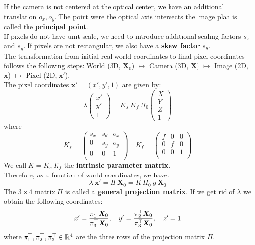 If the camera is not centered at the optical center, we have an additional
translation $o_x, o_y$. The point were the optical axis intersects
the image plan is called the \textbf{principal point}.\\

If pixels do not have unit scale, we need to introduce
additional scaling factors $s_x$ and $s_y$.
If pixels are not rectangular, we also have a \textbf{skew factor} $s_{\theta}$.\\

The transformation from initial real world coordinates to final pixel coordinates
follows the following steps:
World (3D, $\bm{X}_0$) $\mapsto$ Camera (3D, $\bm{X}$)
$\mapsto$ Image (2D, $\bm{x}$) $\mapsto$ Pixel (2D, $\bm{x'}$).\\

The pixel coordinates $\bm{x'} = (x',y',1)$ are given by:
\[\lambda \begin{pmatrix}x' \\ y' \\ 1\end{pmatrix} =
	K_s\ K_f\ \Pi_0
	\begin{pmatrix}X \\ Y \\ Z \\ 1\end{pmatrix}
\]
where
\[K_s = \begin{pmatrix}
		s_x & s_{\theta} & o_x \\
		0 & s_y & o_y \\
		0 & 0 & 1 \\
	\end{pmatrix}
	\quad K_f =
	\begin{pmatrix}
		f & 0 & 0 \\
		0 & f & 0 \\
		0 & 0 & 1 \\
	\end{pmatrix}
\]
We call $K = K_s\ K_f$ the \textbf{intrinsic parameter matrix}.\\

Therefore, as a function of world coordinates, we have:
\[\boxed{ \lambda\ \bm{x'} = \Pi\ \bm{X}_0
	= K\ \Pi_0\ g\ \bm{X}_0}
\]
The $3 \times 4$ matrix $\Pi$ is called a \textbf{general projection matrix}.
If we get rid of $\lambda$ we obtain the following coordinates:
\[ x' = \frac{\pi_1^{\top} \bm{X}_0}{\pi_3^{\top} \bm{X}_0},\quad
 y' = \frac{\pi_2^{\top} \bm{X}_0}{\pi_3^{\top} \bm{X}_0},\quad
 z' = 1
\]
where $\pi_1^{\top}, \pi_2^{\top}, \pi_3^{\top} \in \mathbb{R}^4$
are the three rows of the projection matrix $\Pi$.



